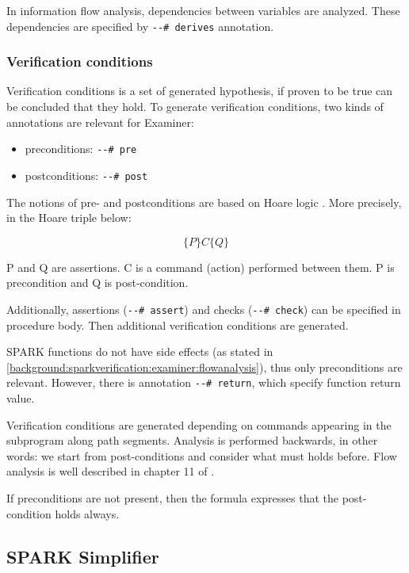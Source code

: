 In information flow analysis, dependencies between variables are analyzed. These dependencies are specified by \lstinline{--# derives} annotation.


\subsubsection{Verification conditions}
\label{background:sparkverification:examiner:vc}

Verification conditions is a set of generated hypothesis, if proven to be true can be concluded that they hold. To generate verification conditions, two kinds of annotations are relevant for Examiner:
\begin{itemize}
	\item preconditions: \lstinline{--# pre}
	\item postconditions: \lstinline{--# post}
\end{itemize}

The notions of pre- and postconditions are based on Hoare logic \cite{HoareLogic:Paper}. More precisely, in the Hoare triple below: 

\begin{equation} \label{eq:hoare_triple}
	\{P\} C \{Q\}
\end{equation}

P and Q are assertions. C is a command (action) performed between them. P is precondition and Q is post-condition.

Additionally, assertions (\lstinline{--# assert}) and checks (\lstinline{--# check}) can be specified in procedure body. Then additional verification conditions are generated.

SPARK functions do not have side effects (as stated in \ref{background:sparkverification:examiner:flowanalysis}), thus only preconditions are relevant. However, there is annotation \lstinline{--# return}, which specify function return value.

Verification conditions are generated depending on commands appearing in the subprogram along path segments. Analysis is performed backwards, in other words: we start from post-conditions and consider what must holds before. Flow analysis is well described in chapter 11 of \cite{Barnes:Book}.

If preconditions are not present, then the formula expresses that the post-condition holds always.



\subsection{SPARK Simplifier}
\label{background:sparkverification:simplifier}

